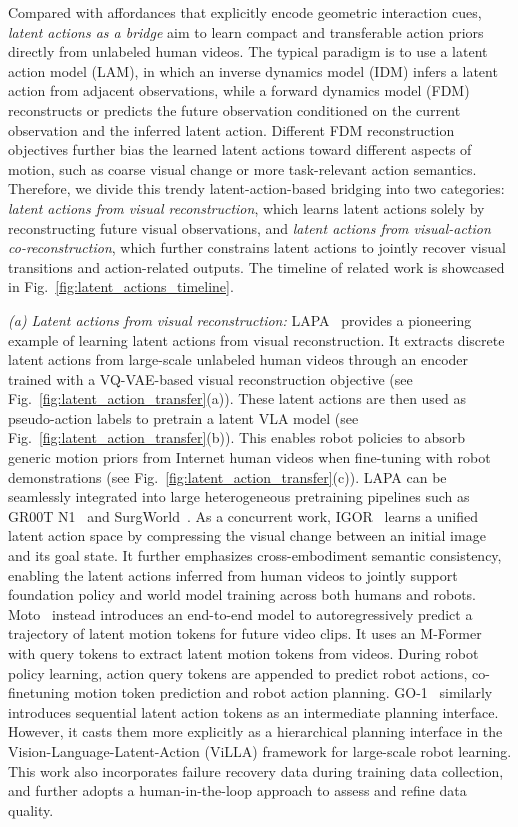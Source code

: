 \documentclass[Afour,sageh,times]{sagej}
\begin{document}
Compared with affordances that explicitly encode geometric interaction cues, \textit{latent actions as a bridge} aim to learn compact and transferable action priors directly from unlabeled human videos. The typical paradigm is to use a latent action model (LAM), in which an inverse dynamics model (IDM) infers a latent action from adjacent observations, while a forward dynamics model (FDM) reconstructs or predicts the future observation conditioned on the current observation and the inferred latent action. Different FDM reconstruction objectives further bias the learned latent actions toward different aspects of motion, such as coarse visual change or more task-relevant action semantics. Therefore, we divide this trendy latent-action-based bridging into two categories: \textit{latent actions from visual reconstruction}, which learns latent actions solely by reconstructing future visual observations, and \textit{latent actions from visual-action co-reconstruction}, which further constrains latent actions to jointly recover visual transitions and action-related outputs. The timeline of related work is showcased in Fig.~\ref{fig:latent_actions_timeline}. 



\textit{(a) Latent actions from visual reconstruction:} LAPA~\citep{ye2024latent} provides a pioneering example of learning latent actions from visual reconstruction. It extracts discrete latent actions from large-scale unlabeled human videos through an encoder trained with a VQ-VAE-based visual reconstruction objective (see Fig.~\ref{fig:latent_action_transfer}(a)). These latent actions are then used as pseudo-action labels to pretrain a latent VLA model (see Fig.~\ref{fig:latent_action_transfer}(b)). This enables robot policies to absorb generic motion priors from Internet human videos when fine-tuning with robot demonstrations (see Fig.~\ref{fig:latent_action_transfer}(c)). LAPA can be seamlessly integrated into large heterogeneous pretraining pipelines such as GR00T N1~\citep{bjorck2025gr00t} and SurgWorld~\citep{he2025surgworld}. As a concurrent work, IGOR~\citep{chen2024igor} learns a unified latent action space by compressing the visual change between an initial image and its goal state. It further emphasizes cross-embodiment semantic consistency, enabling the latent actions inferred from human videos to jointly support foundation policy and world model training across both humans and robots.
Moto~\citep{chen2025moto} instead introduces an end-to-end model to autoregressively predict a trajectory of latent motion tokens for future video clips. It uses an M-Former with query tokens to extract latent motion tokens from videos. During robot policy learning, action query tokens are appended to predict robot actions, co-finetuning motion token prediction and robot action planning. GO-1~\citep{bu2025agibot} similarly introduces sequential latent action tokens as an intermediate planning interface. However, it casts them more explicitly as a hierarchical planning interface in the Vision-Language-Latent-Action (ViLLA) framework for large-scale robot learning. This work also incorporates failure recovery data during training data collection, and further adopts a human-in-the-loop approach to assess and refine data quality.
\end{document}
